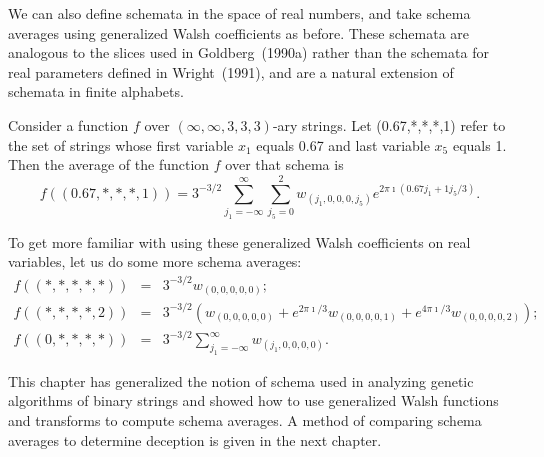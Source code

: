 We can also define schemata in the space of real numbers,
and take schema averages using generalized Walsh coefficients as before.  
These schemata are analogous to the slices used in Goldberg~(1990a) rather
than the schemata for real parameters defined in Wright~(1991), and are
a natural extension of schemata in finite alphabets.

\begin{example}
Consider a function $f$ over $(\infty,\infty,3,3,3)$-ary strings.
Let
(0.67,*,*,*,1) refer to the set of strings whose first variable $x_1$
equals 0.67 and last variable $x_5$ equals 1.  Then the average of the
function $f$ over that schema is
\begin{equation}
f((0.67,*,*,*,1))=3^{-3/2}\sum_{j_1=-\infty}^{\infty} {\sum_{j_5=0}^2{
        w_{(j_1,0,0,0,j_5)} e^{2 \pi \imath (0.67 j_1 + 1 j_5/3)}
}}.
\end{equation}
\end{example}
To get more familiar with using these generalized Walsh coefficients on
real variables, let us do some more schema averages:
\begin{eqnarray}
f((*,*,*,*,*)) &=& 3^{-3/2} w_{(0,0,0,0,0)}; \nonumber\\
f((*,*,*,*,2)) &=& 3^{-3/2} (w_{(0,0,0,0,0)} +
        e^{2 \pi \imath/3} w_{(0,0,0,0,1)} +
        e^{4 \pi \imath/3} w_{(0,0,0,0,2)}); \nonumber\\
f((0,*,*,*,*)) &=& 3^{-3/2} \sum_{j_1=-\infty}^{\infty}{w_{(j_1,0,0,0,0)}}.
\end{eqnarray}

This chapter has generalized the notion of schema used in analyzing
genetic algorithms of binary strings and showed how to use generalized
Walsh functions and transforms to compute schema averages.  A method of
comparing schema averages to determine deception is given in the
next chapter.


